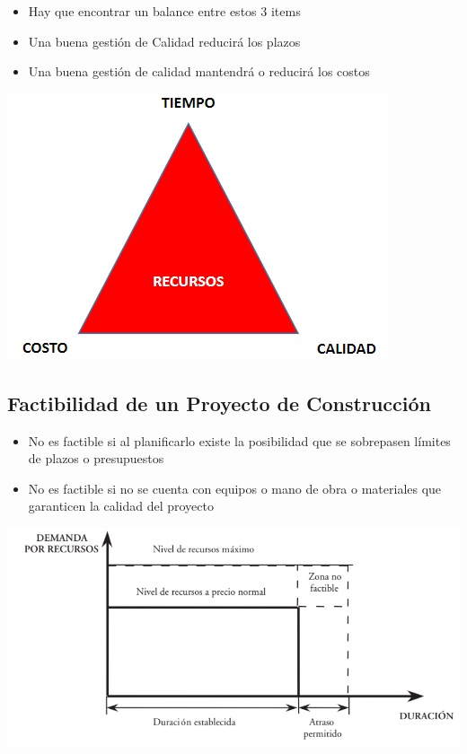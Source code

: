 \documentclass{article} %
\begin{document}
\begin{minipage}{0.45\textwidth}
    \begin{itemize}
        \item Hay que encontrar un balance entre estos 3 items
        \item Una buena gestión de Calidad reducirá los plazos
        \item Una buena gestión de calidad mantendrá o reducirá los costos
    \end{itemize}
\end{minipage}
\hfill
\begin{minipage}{0.45\textwidth}
    \centering
    \includegraphics[width=\textwidth]{gestion_recursos.png}
\end{minipage}

\subsection{Factibilidad de un Proyecto de Construcción}
\begin{minipage}{0.45\textwidth}
    \begin{itemize}
        \item No es factible si al planificarlo existe la posibilidad que se sobrepasen límites de plazos o presupuestos
        \item No es factible si no se cuenta con equipos o mano de obra o materiales que garanticen la calidad del proyecto
    \end{itemize}
\end{minipage}
\hfill
\begin{minipage}{0.5\textwidth}
    \centering
    \includegraphics[width=1.2\textwidth]{factibilidad_proyecto.png}
\end{minipage}
\end{document}
